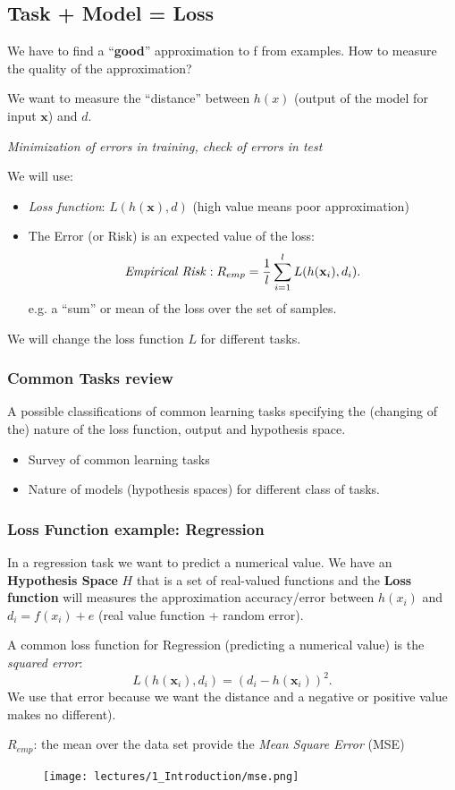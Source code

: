 \documentclass[../main.tex]{subfiles}
\begin{document}
\subsection{Task + Model = Loss}
We have to find a  “\textbf{good}” approximation to f from examples. How to measure the quality of the approximation?

\noindent We want to measure the “distance” between $h(x)$ (output of the model for input $\mathbf{x}$) and $d$.
\begin{center}
\textit{Minimization of errors in training, check of errors in test}\\
\end{center}
\noindent We will use:
\begin{itemize}
    \item \emph{Loss function}: $L(h(\textbf{x}),d)$ (high value means poor approximation)
    \item The Error (or Risk) is an expected value of the loss:
	\[
	    \text{\emph{Empirical Risk}}: R_{emp}= \frac{1}{l} \sum_{i=1}^{l} L(h(\textbf{x}_i),d_i)
	.\] 
    e.g. a “sum” or mean of the loss over the set of samples.
\end{itemize}
We will change the loss function $L$ for different tasks.

\subsubsection*{Common Tasks review}%
A possible classifications of common learning tasks specifying the (changing of the) nature of the loss function, output and hypothesis space.
\begin{itemize}
    \item Survey of common learning tasks
    \item Nature of models (hypothesis spaces) for different class of tasks.
\end{itemize}

\subsubsection{Loss Function example: Regression}
In a regression task we want to predict a numerical value. We have an \textbf{Hypothesis Space} $H$ that is a set of real-valued functions and the \textbf{Loss function} will measures the approximation accuracy/error between $h(x_i)$ and $d_i = f(x_i) + e$ (real value function + random error).

A common loss function for Regression (predicting a numerical value) is the \emph{squared error}: 
\[
 L(h(\textbf{x}_{i}),d_{i}) = (d_{i} - h(\textbf{x}_{i}))^{2}   
.\] 
We use that error because we want the distance and a negative or positive value makes no different).
\begin{center}
    $R_{emp}$: the mean over the data set provide the \emph{Mean Square Error} (MSE)
\end{center}
\begin{figure}[ht]
    \centering
    \texttt{[image: lectures/1\_Introduction/mse.png]}
\end{figure}
\end{document}
